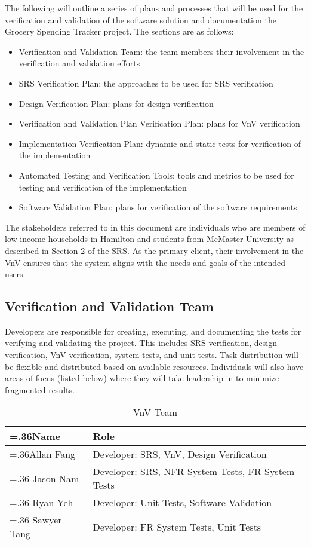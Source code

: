 \documentclass[12pt, titlepage]{article}
\begin{document}
The following will outline a series of plans and processes that will be used for the verification and validation of the software solution and documentation the Grocery Spending Tracker project. The sections are as follows:
\begin{itemize}
    \item Verification and Validation Team: the team members their involvement in the verification and validation efforts 
    \item SRS Verification Plan: the approaches to be used for SRS verification
    \item Design Verification Plan: plans for design verification
    \item Verification and Validation Plan Verification Plan: plans for VnV verification
    \item Implementation Verification Plan: dynamic and static tests for verification of the implementation
    \item Automated Testing and Verification Tools: tools and metrics to be used for testing and verification of the implementation
    \item Software Validation Plan: plans for verification of the software requirements
\end{itemize}
The stakeholders referred to in this document are individuals who are members of low-income households in Hamilton and students from McMaster University as described in Section 2 of the \href{https://github.com/r-yeh/grocery-spending-tracker/blob/master/docs/SRS/SRS.pdf}{SRS}. As the primary client, their involvement in the VnV ensures that the system aligns with the needs and goals of the intended users.

\subsection{Verification and Validation Team}
Developers are responsible for creating, executing, and documenting the tests for verifying and validating the project. This includes SRS verification, design verification, VnV verification, system tests, and unit tests. Task distribution will be flexible and distributed based on available resources. Individuals will also have areas of focus (listed below) where they will take leadership in to minimize fragmented results. 
\begin{table}[H]
    \centering
    \begin{tabularx}{\textwidth}{|>{\hsize=.36\hsize}X|>{\hsize=1.64\hsize}X|}
        \hline
        \textbf{Name} & \textbf{Role}\\
        \hline
        Allan Fang & Developer: SRS, VnV, Design Verification\\
        \hline
        Jason Nam & Developer: SRS, NFR System Tests, FR System Tests\\
        \hline
        Ryan Yeh & Developer: Unit Tests, Software Validation\\
        \hline
        Sawyer Tang & Developer: FR System Tests, Unit Tests\\
        \hline
    \end{tabularx}
    \caption{VnV Team}
    \label{tab:vnvteam}
\end{table}
\end{document}
